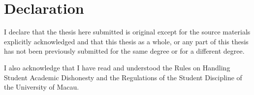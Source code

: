 \section*{\centering Declaration}
\begin{spacing}{2}
    \par
    I declare that the thesis here submitted is original except for the source materials explicitly acknowledged and that this thesis as a whole, or any part of this thesis has not been previously submitted for the same degree or for a different degree. 
    \par
    I also acknowledge that I have read and understood the Rules on Handling Student Academic Dishonesty and the Regulations of the Student Discipline of the University of Macau.
\end{spacing}